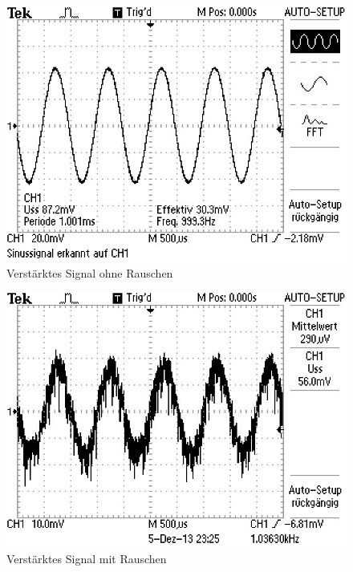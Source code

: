 \documentclass[11pt]{article}
\begin{document}
\begin{figure}[h]
\centering
\includegraphics[scale=0.85]{Bilder/3-sine.png}
\caption{Verstärktes Signal ohne Rauschen}
\label{Abb3}
\end{figure}
\begin{figure}[h]
\centering
\includegraphics[scale=0.85]{Bilder/3-noise.png}
\caption{Verstärktes Signal mit Rauschen}
\label{Abb4}
\end{figure}
\end{document}
